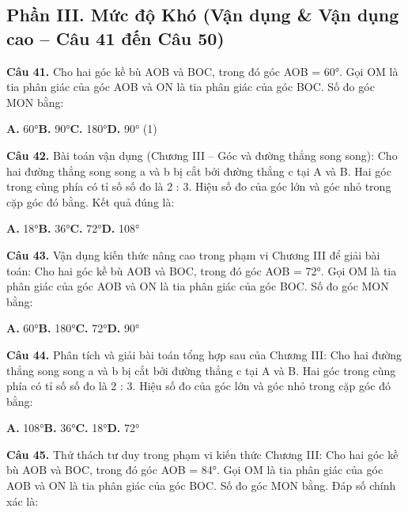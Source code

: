 \documentclass[11pt,a4paper]{article}
\begin{document}
\subsection*{\color{accent} Phần III. Mức độ Khó (Vận dụng \& Vận dụng cao -- Câu 41 đến Câu 50)}
\textbf{\color{primary} Câu 41.} Cho hai góc kề bù AOB và BOC, trong đó góc AOB = 60°. Gọi OM là tia phân giác của góc AOB và ON là tia phân giác của góc BOC. Số đo góc MON bằng:\par
\hspace*{1.5em}\textbf{A.} 60°\quad\quad \textbf{B.} 90°\quad\quad \textbf{C.} 180°\quad\quad \textbf{D.} 90° (1)\par\vspace{2pt}
\textbf{\color{primary} Câu 42.} Bài toán vận dụng (Chương III – Góc và đường thẳng song song): Cho hai đường thẳng song song a và b bị cắt bởi đường thẳng c tại A và B. Hai góc trong cùng phía có tỉ số số đo là 2 : 3. Hiệu số đo của góc lớn và góc nhỏ trong cặp góc đó bằng. Kết quả đúng là:\par
\hspace*{1.5em}\textbf{A.} 18°\quad\quad \textbf{B.} 36°\quad\quad \textbf{C.} 72°\quad\quad \textbf{D.} 108°\par\vspace{2pt}
\textbf{\color{primary} Câu 43.} Vận dụng kiến thức nâng cao trong phạm vi Chương III để giải bài toán: Cho hai góc kề bù AOB và BOC, trong đó góc AOB = 72°. Gọi OM là tia phân giác của góc AOB và ON là tia phân giác của góc BOC. Số đo góc MON bằng:\par
\hspace*{1.5em}\textbf{A.} 60°\quad\quad \textbf{B.} 180°\quad\quad \textbf{C.} 72°\quad\quad \textbf{D.} 90°\par\vspace{2pt}
\textbf{\color{primary} Câu 44.} Phân tích và giải bài toán tổng hợp sau của Chương III: Cho hai đường thẳng song song a và b bị cắt bởi đường thẳng c tại A và B. Hai góc trong cùng phía có tỉ số số đo là 2 : 3. Hiệu số đo của góc lớn và góc nhỏ trong cặp góc đó bằng:\par
\hspace*{1.5em}\textbf{A.} 108°\quad\quad \textbf{B.} 36°\quad\quad \textbf{C.} 18°\quad\quad \textbf{D.} 72°\par\vspace{2pt}
\textbf{\color{primary} Câu 45.} Thử thách tư duy trong phạm vi kiến thức Chương III: Cho hai góc kề bù AOB và BOC, trong đó góc AOB = 84°. Gọi OM là tia phân giác của góc AOB và ON là tia phân giác của góc BOC. Số đo góc MON bằng. Đáp số chính xác là:\par
\end{document}
